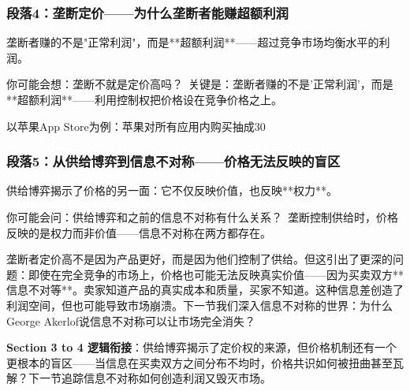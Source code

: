 \documentclass[a4paper,12pt]{book}
\begin{document}
	\subsubsection*{段落4：垄断定价——为什么垄断者能赚超额利润}
	垄断者赚的不是"正常利润"，而是**超额利润**——超过竞争市场均衡水平的利润。
	\begin{tcolorbox}[colback=yellow!5, title=\textit{读者行为预测}]
		你可能会想：垄断不就是定价高吗？\ 关键是：垄断者赚的不是'正常利润'，而是**超额利润**——利用控制权把价格设在竞争价格之上。
	\end{tcolorbox}

以苹果App Store为例：苹果对所有应用内购买抽成30%

	\subsubsection*{段落5：从供给博弈到信息不对称——价格无法反映的盲区}
	供给博弈揭示了价格的另一面：它不仅反映价值，也反映**权力**。
	\begin{tcolorbox}[colback=yellow!5, title=\textit{读者行为预测}]
		你可能会问：供给博弈和之前的信息不对称有什么关系？\ 垄断控制供给时，价格反映的是权力而非价值——信息不对称在两方都存在。
	\end{tcolorbox}

垄断者定价高不是因为产品更好，而是因为他们控制了供给。但这引出了更深的问题：即使在完全竞争的市场上，价格也可能无法反映真实价值——因为买卖双方**信息不对等**。卖家知道产品的真实成本和质量，买家不知道。这种信息差创造了利润空间，但也可能导致市场崩溃。下一节我们深入信息不对称的世界：为什么George Akerlof说信息不对称可以让市场完全消失？

	\textbf{Section 3 to 4 逻辑衔接}：供给博弈揭示了定价权的来源，但价格机制还有一个更根本的盲区——当信息在买卖双方之间分布不均时，价格共识如何被扭曲甚至瓦解？下一节追踪信息不对称如何创造利润又毁灭市场。


	
\end{document}
